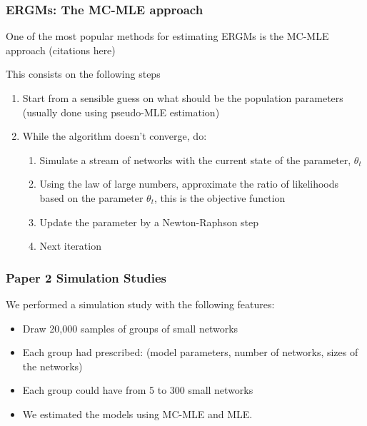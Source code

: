 \documentclass[aspectratio=169, 9pt]{beamer}
\begin{document}
\begin{frame}[label=mcmle]
\frametitle{ERGMs: The MC-MLE approach}

One of the most popular methods for estimating ERGMs is the MC-MLE approach (citations here)

This consists on the following steps

\begin{enumerate}
\item Start from a sensible guess on what should be the population parameters
(usually done using pseudo-MLE estimation)
\item While the algorithm doesn't converge, do:
  \begin{enumerate}
  \item Simulate a stream of networks with the current state of the parameter,
  $\theta_t$
  \item Using the law of large numbers, approximate the ratio of likelihoods 
  based on the parameter $\theta_t$, this is the objective function
  \item Update the parameter by a Newton-Raphson step
  \item Next iteration
  \end{enumerate}
\end{enumerate}

\vfill\hfill \hyperlink{art}{}


\end{frame}



\begin{frame}[label=ergmitodgp]
\frametitle{Paper 2 Simulation Studies}

We performed a simulation study with the following features:

\begin{itemize}%
\item Draw 20,000 samples of groups of small networks
\item Each group had prescribed: (model parameters, number of networks, sizes of the networks)
\item Each group could have from 5 to 300 small networks
\item We estimated the models using MC-MLE and MLE.
\end{itemize}

\vfill\hfill\hyperlink{ergmitoexample}{}

\end{frame}
\end{document}
